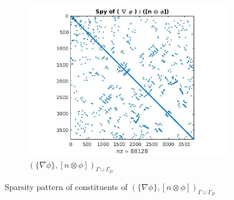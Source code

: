 \documentclass[a4paper,twoside,openright]{book}
\begin{document}
\begin{figure}
\begin{subfigure}{\textwidth}
  \includegraphics[width=\textwidth]{figure3.jpg}
  \caption{$(\lbrace \nabla \phi \rbrace,[n \otimes \phi])_{\Gamma \cup \Gamma_D}$}
  \label{fig:figure3}
\end{subfigure}
\caption{Sparsity pattern of constituents of $(\lbrace \nabla \phi  \rbrace,[n \otimes \phi])_{\Gamma \cup \Gamma_D}$}
\label{figure_3_all}
\end{figure}
\end{document}
